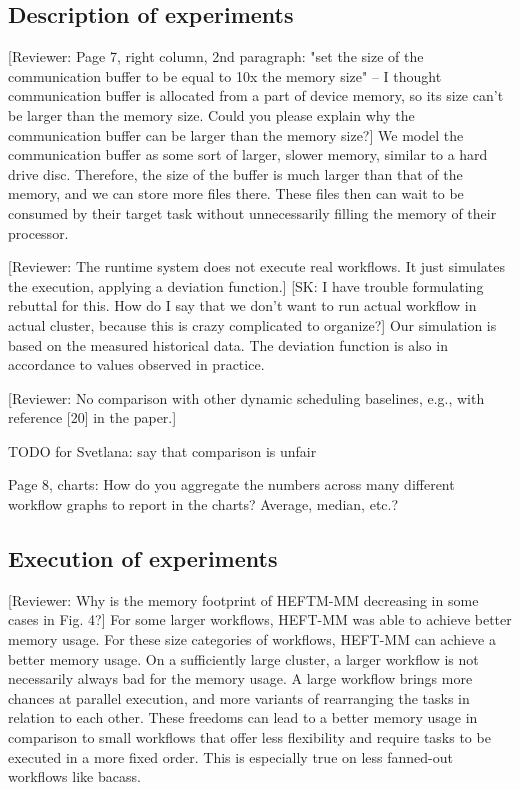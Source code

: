 \documentclass{article}
\newcommand{\skug}[1]{{\color{blue}[SK: #1]}}
\newcommand{\review}[1]{{\color{orange}[Reviewer: #1]}}
\begin{document}
    \subsection{Description of experiments}


    \review{Page 7, right column, 2nd paragraph: "set the size of the communication buffer to be equal to 10x the memory size" -- I thought communication buffer is allocated from a part of device memory, so its size can't be larger than the memory size.
    Could you please explain why the communication buffer can be larger than the memory size?}
    We model the communication buffer as some sort of larger, slower memory, similar to a hard drive disc.
    Therefore, the size of the buffer is much larger than that of the memory, and we can store more files there.
    These files then can wait to be consumed by their target task without unnecessarily filling the memory of their processor.

    \review{The runtime system does not execute real workflows. It just simulates the execution, applying a deviation function.}
    \skug{I have trouble formulating rebuttal for this. How do I say that we don't want to run actual workflow in actual cluster,
        because this is crazy complicated to organize?}
    Our simulation is based on the measured historical data.
    The deviation function is also in accordance to values observed in practice.


    \review{No comparison with other dynamic scheduling baselines, e.g., with reference [20] in the paper.}

    TODO for Svetlana: say that comparison is unfair


    Page 8, charts: How do you aggregate the numbers across many different workflow graphs to report in the charts? Average, median, etc.?


    \subsection{Execution of experiments}

    \review{Why is the memory footprint of HEFTM-MM decreasing in some cases in Fig. 4?}
    For some larger workflows, HEFT-MM was able to achieve better memory usage.
    For these size categories of workflows, HEFT-MM can achieve a better memory usage. On a sufficiently large cluster, a larger workflow is not necessarily always bad for the memory usage.
    A large workflow brings more chances at parallel execution, and more variants of rearranging the tasks in relation to each other.
    These freedoms can lead to a better memory usage in comparison to small workflows that offer less flexibility and require tasks to be executed in a more fixed order.
    This is especially true on less fanned-out workflows like bacass.
\end{document}

